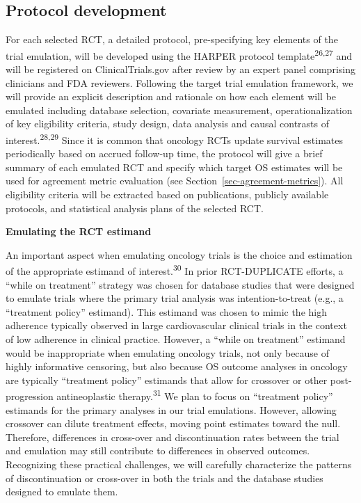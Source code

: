 \documentclass[
  letterpaper,
  DIV=11,
  numbers=noendperiod]{scrartcl}
\begin{document}
\subsection{Protocol development}\label{protocol-development}

For each selected RCT, a detailed protocol, pre-specifying key elements
of the trial emulation, will be developed using the HARPER protocol
template\textsuperscript{26,27} and will be registered on
ClinicalTrials.gov after review by an expert panel comprising clinicians
and FDA reviewers. Following the target trial emulation framework, we
will provide an explicit description and rationale on how each element
will be emulated including database selection, covariate measurement,
operationalization of key eligibility criteria, study design, data
analysis and causal contrasts of interest.\textsuperscript{28,29} Since
it is common that oncology RCTs update survival estimates periodically
based on accrued follow-up time, the protocol will give a brief summary
of each emulated RCT and specify which target OS estimates will be used
for agreement metric evaluation (see
Section~\ref{sec-agreement-metrics}). All eligibility criteria will be
extracted based on publications, publicly available protocols, and
statistical analysis plans of the selected RCT.

\textbf{Emulating the RCT estimand}

An important aspect when emulating oncology trials is the choice and
estimation of the appropriate estimand of interest.\textsuperscript{30}
In prior RCT-DUPLICATE efforts, a ``while on treatment'' strategy was
chosen for database studies that were designed to emulate trials where
the primary trial analysis was intention-to-treat (e.g., a ``treatment
policy'' estimand). This estimand was chosen to mimic the high adherence
typically observed in large cardiovascular clinical trials in the
context of low adherence in clinical practice. However, a ``while on
treatment'' estimand would be inappropriate when emulating oncology
trials, not only because of highly informative censoring, but also
because OS outcome analyses in oncology are typically ``treatment
policy'' estimands that allow for crossover or other post-progression
antineoplastic therapy.\textsuperscript{31} We plan to focus on
``treatment policy'' estimands for the primary analyses in our trial
emulations. However, allowing crossover can dilute treatment effects,
moving point estimates toward the null. Therefore, differences in
cross-over and discontinuation rates between the trial and emulation may
still contribute to differences in observed outcomes. Recognizing these
practical challenges, we will carefully characterize the patterns of
discontinuation or cross-over in both the trials and the database
studies designed to emulate them.
\end{document}
